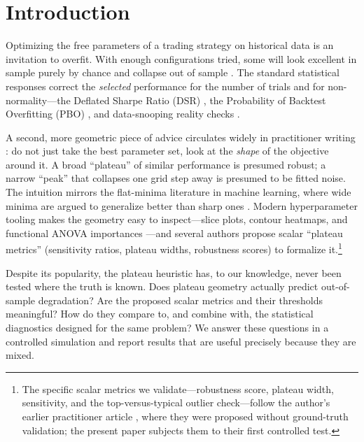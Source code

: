 \documentclass[11pt]{article}
\begin{document}
\section{Introduction}

Optimizing the free parameters of a trading strategy on historical data is an
invitation to overfit. With enough configurations tried, some will look
excellent in sample purely by chance and collapse out of sample
\citep{bailey2017pbo,harvey2016crosssection,lopezdeprado2018}. The standard
statistical responses correct the \emph{selected} performance for the number of
trials and for non-normality---the Deflated Sharpe Ratio (DSR)
\citep{bailey2014dsr}, the Probability of Backtest Overfitting (PBO)
\citep{bailey2017pbo}, and data-snooping reality checks
\citep{white2000reality,harvey2015backtesting}.

A second, more geometric piece of advice circulates widely in practitioner
writing \citep{pardo2008,lopezdeprado2018,arnott2019protocol}: do not just take
the best parameter set, look at the \emph{shape} of the objective around it. A
broad ``plateau'' of similar performance is presumed robust; a narrow ``peak''
that collapses one grid step away is presumed to be fitted noise. The intuition
mirrors the flat-minima literature in machine learning, where wide minima are
argued to generalize better than sharp ones
\citep{hochreiter1997flat,keskar2017sharp}. Modern hyperparameter tooling makes
the geometry easy to inspect---slice plots, contour heatmaps, and functional
ANOVA importances \citep{hutter2014fanova,akiba2019optuna}---and several authors
propose scalar ``plateau metrics'' (sensitivity ratios, plateau widths,
robustness scores) to formalize it.\footnote{The specific scalar metrics we
validate---robustness score, plateau width, sensitivity, and the
top-versus-typical outlier check---follow the author's earlier practitioner
article \citep{soloviov2026plateau}, where they were proposed without
ground-truth validation; the present paper subjects them to their first
controlled test.}

Despite its popularity, the plateau heuristic has, to our knowledge, never been
tested where the truth is known. Does plateau geometry actually predict
out-of-sample degradation? Are the proposed scalar metrics and their thresholds
meaningful? How do they compare to, and combine with, the statistical diagnostics
designed for the same problem? We answer these questions in a controlled
simulation and report results that are useful precisely because they are mixed.
\end{document}

